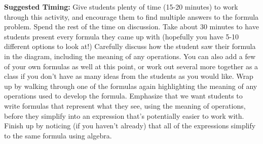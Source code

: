 \documentclass{ximera}
\begin{document}
\begin{instructorNotes}
{\bf Suggested Timing:} Give students plenty of time (15-20 minutes) to work through this activity, and encourage them to find multiple answers to the formula problem. Spend the rest of the time on discussion. Take about 30 minutes to have students present every formula they came up with (hopefully you have 5-10 different options to look at!) Carefully discuss how the student saw their formula in the diagram, including the meaning of any operations. You can also add a few of your own formulas as well at this point, or work out several more together as a class if you don't have as many ideas from the students as you would like. Wrap up by walking through one of the formulas again highlighting the meaning of any operations used to develop the formula. Emphasize that we want students to write formulas that represent what they see, using the meaning of operations, before they simplify into an expression that's potentially easier to work with. Finish up by noticing (if you haven't already) that all of the expressions simplify to the same formula using algebra.


\end{instructorNotes}
\end{document}
